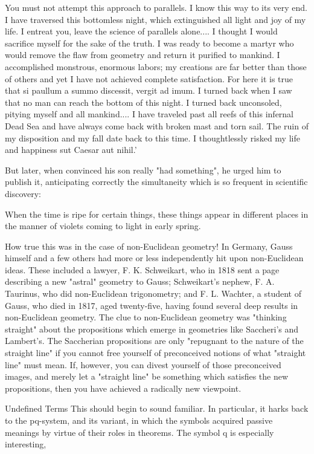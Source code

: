 You must not attempt this approach to parallels. I know this way to its very end. I have traversed this bottomless night, which extinguished all light and joy of my life. I entreat you, leave the science of parallels alone.... I thought I would sacrifice myself for the sake of the truth. I was ready to become a martyr who would remove the flaw from geometry and return it purified to mankind. I accomplished monstrous, enormous labors; my creations are far better than those of others and yet I have not achieved complete satisfaction. For here it is true that si paullum a summo discessit, vergit ad imum. I turned back when I saw that no man can reach the bottom of this night. I turned back unconsoled, pitying myself and all mankind.... I have traveled past all reefs of this infernal Dead Sea and have always come back with broken mast and torn sail. The ruin of my disposition and my fall date back to this time. I thoughtlessly risked my life and happiness sut Caesar aut nihil.' 

But later, when convinced his son really "had something", he urged him to publish it, anticipating correctly the simultaneity which is so frequent in scientific discovery: 

When the time is ripe for certain things, these things appear in different places in the manner of violets coming to light in early spring. 

How true this was in the case of non-Euclidean geometry! In Germany, Gauss himself and a few others had more or less independently hit upon non-Euclidean ideas. These included a lawyer, F. K. Schweikart, who in 1818 sent a page describing a new "astral" geometry to Gauss; Schweikart's nephew, F. A. Taurinus, who did non-Euclidean trigonometry; and F. L. Wachter, a student of Gauss, who died in 1817, aged twenty-five, having found several deep results in non-Euclidean geometry. The clue to non-Euclidean geometry was "thinking straight" about the propositions which emerge in geometries like Saccheri's and Lambert's. The Saccherian propositions are only "repugnant to the nature of the straight line" if you cannot free yourself of preconceived notions of what "straight line" must mean. If, however, you can divest yourself of those preconceived images, and merely let a "straight line" be something which satisfies the new propositions, then you have achieved a radically new viewpoint. 

Undefined Terms This should begin to sound familiar. In particular, it harks back to the pq-system, and its variant, in which the symbols acquired passive meanings by virtue of their roles in theorems. The symbol q is especially interesting, 








